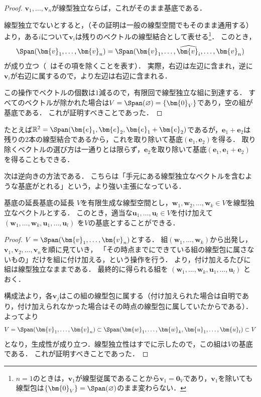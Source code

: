 \begin{tleftbar}
\begin{proof}
  $\bm{v}_1, \dots, \bm{v}_n$が線型独立ならば，これがそのまま基底である．

  線型独立でないとすると，（その証明は一般の線型空間でもそのまま通用する）より，ある$i$について$\bm{v}_i$は残りのベクトルの線型結合として表せる\footnote{$n=1$のときは，$\bm{v}_1$が線型従属であることから$\bm{v}_1=\bm{0}_V$であり，$\bm{v}_1$を除いても線型包は$\{\bm{0}_V\}=\Span(\varnothing)$のまま変わらない．}．
  このとき，
  \[
    \Span(\bm{v}_1, \dots, \bm{v}_n)
    = \Span(\bm{v}_1, \dots, \widehat{\bm{v}_i}, \dots, \bm{v}_n)
  \]
  が成り立つ（$\widehat{\phantom{x}}$はその項を除くことを表す）．
  実際，右辺は左辺に含まれ，逆に$\bm{v}_i$が右辺に属するので，より左辺は右辺に含まれる．

  この操作でベクトルの個数は$1$減るので，有限回で線型独立な組に到達する．
  すべてのベクトルが除かれた場合は$V = \Span(\varnothing) = \{\bm{0}_V\}$であり，空の組が基底である．
  これが証明すべきことであった．
\end{proof}
\end{tleftbar}

たとえば$\mathbb{R}^2=\Span(\bm{e}_1,\bm{e}_2,\bm{e}_1+\bm{e}_2)$であるが，$\bm{e}_1+\bm{e}_2$は残りの$2$本の線型結合であるから，これを取り除いて基底$(\bm{e}_1,\bm{e}_2)$を得る．
取り除くベクトルの選び方は一通りとは限らず，$\bm{e}_2$を取り除いて基底$(\bm{e}_1,\bm{e}_1+\bm{e}_2)$を得ることもできる．

次は逆向きの方法である．
こちらは「手元にある線型独立なベクトルを含むような基底がとれる」という，より強い主張になっている．

\begin{theorem}{基底の延長}{基底の延長}
  $V$を有限生成な線型空間とし，$\bm{w}_1, \bm{w}_2, \dots, \bm{w}_k \in V$を線型独立なベクトルとする．
  このとき，適当な$\bm{u}_1, \dots, \bm{u}_l \in V$を付け加えて
  $(\bm{w}_1, \dots, \bm{w}_k, \bm{u}_1, \dots, \bm{u}_l)$
  を$V$の基底とすることができる．
\end{theorem}

\begin{tleftbar}
\begin{proof}
  $V = \Span(\bm{v}_1, \dots, \bm{v}_n)$とする．
  組$(\bm{w}_1, \dots, \bm{w}_k)$から出発し，$\bm{v}_1, \bm{v}_2, \dots, \bm{v}_n$を順に見ていき，
  「その時点までにできている組の線型包に属さないもの」だけを組に付け加える，という操作を行う．
  より，付け加えるたびに組は線型独立なままである．
  最終的に得られる組を
  $(\bm{w}_1, \dots, \bm{w}_k, \bm{u}_1, \dots, \bm{u}_l)$
  とおく．

  構成法より，各$\bm{v}_j$はこの組の線型包に属する（付け加えられた場合は自明であり，付け加えられなかった場合はその時点の線型包に属していたからである）．
  よってより
  \[
    V = \Span(\bm{v}_1, \dots, \bm{v}_n)
    \subset \Span(\bm{w}_1, \dots, \bm{w}_k, \bm{u}_1, \dots, \bm{u}_l)
    \subset V
  \]
  となり，生成性が成り立つ．線型独立性はすでに示したので，この組は$V$の基底である．
  これが証明すべきことであった．
\end{proof}
\end{tleftbar}

